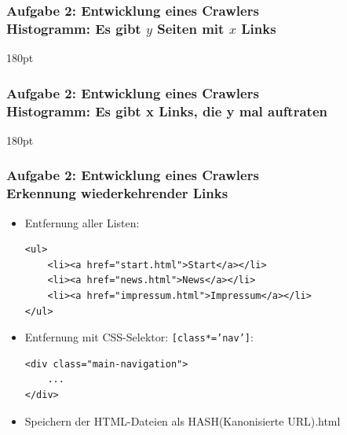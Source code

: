 \documentclass[accentcolor=tud7b,noresetcounter]{tudbeamer}
\begin{document}
  \begin{frame}[t]
  	\frametitle{Aufgabe 2: Entwicklung eines Crawlers\\
	Histogramm: Es gibt $y$ Seiten mit $x$ Links}
	\resizebox {\columnwidth} {180pt} {
	}
  \end{frame}
  
  \begin{frame}[t]
  	\frametitle{Aufgabe 2: Entwicklung eines Crawlers\\
	Histogramm: Es gibt x Links, die y mal auftraten}
	\resizebox {\columnwidth} {180pt} {
	}
  \end{frame}
  
  \begin{frame}[fragile]
  	\frametitle{Aufgabe 2: Entwicklung eines Crawlers\\
	Erkennung wiederkehrender Links}
	\begin{itemize}
		\item Entfernung aller Listen:\begin{lstlisting}
<ul>
	<li><a href="start.html">Start</a></li>
	<li><a href="news.html">News</a></li>
	<li><a href="impressum.html">Impressum</a></li>
</ul>
	\end{lstlisting}
	\item Entfernung mit 
CSS-Selektor: \texttt{[class*='nav']}:\begin{lstlisting}
<div class="main-navigation">
	...
</div>
	\end{lstlisting}
	\item Speichern der HTML-Dateien als HASH(Kanonisierte URL).html
	\end{itemize}
 \end{frame}
  
\end{document}
